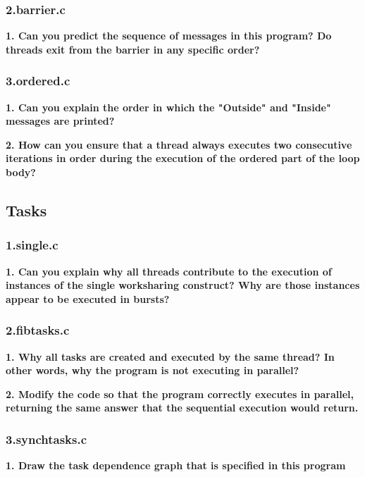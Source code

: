 \documentclass[12pt, a4paper]{article}
\begin{document}
\subsubsection{2.barrier.c}

\textbf{1. Can you predict the sequence of messages in this program? Do threads exit from the barrier
in any specific order?}

\subsubsection{3.ordered.c}

\textbf{1. Can you explain the order in which the "Outside" and "Inside" messages are printed?}

\hfill

\textbf{2. How can you ensure that a thread always executes two consecutive iterations in order during
the execution of the ordered part of the loop body?}

\subsection{Tasks}

\subsubsection{1.single.c}

\textbf{1. Can you explain why all threads contribute to the execution of instances of the single worksharing construct? Why are those instances appear to be executed in bursts?}

\subsubsection{2.fibtasks.c}

\textbf{1. Why all tasks are created and executed by the same thread? In other words, why the program
is not executing in parallel?}

\hfill

\textbf{2. Modify the code so that the program correctly executes in parallel, returning the same answer
that the sequential execution would return.}

\subsubsection{3.synchtasks.c}

\textbf{1. Draw the task dependence graph that is specified in this program}
\end{document}
